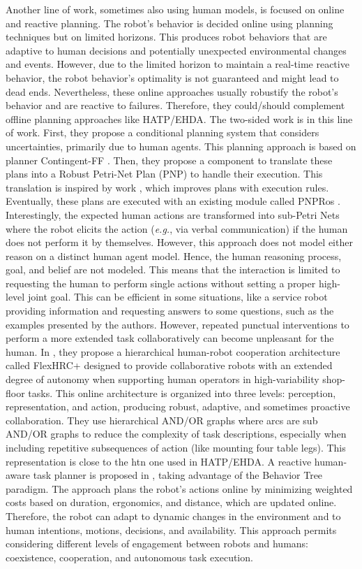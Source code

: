 Another line of work, sometimes also using human models, is focused on online and reactive planning. The robot's behavior is decided online using planning techniques but on limited horizons. This produces robot behaviors that are adaptive to human decisions and potentially unexpected environmental changes and events. However, due to the limited horizon to maintain a real-time reactive behavior, the robot behavior's optimality is not guaranteed and might lead to dead ends. Nevertheless, these online approaches usually robustify the robot's behavior and are reactive to failures. Therefore, they could/should complement offline planning approaches like HATP/EHDA.
The two-sided work \cite{sanelli_short_term_2017} is in this line of work. First, they propose a conditional planning system that considers uncertainties, primarily due to human agents. This planning approach is based on planner Contingent-FF \cite{hoffmann2005contingent}. Then, they propose a component to translate these plans into a Robust Petri-Net Plan (PNP) to handle their execution. This translation is inspired by work \cite{iocchi2016practical}, which improves plans with execution rules. Eventually, these plans are executed with an existing module called PNPRos \cite{ziparo2011petri}. Interestingly, the expected human actions are transformed into sub-Petri Nets where the robot elicits the action (\textit{e.g.}, via verbal communication) if the human does not perform it by themselves. 
However, this approach does not model either reason on a distinct human agent model. Hence, the human reasoning process, goal, and belief are not modeled. This means that the interaction is limited to requesting the human to perform single actions without setting a proper high-level joint goal. This can be efficient in some situations, like a service robot providing information and requesting answers to some questions, such as the examples presented by the authors. However, repeated punctual interventions to perform a more extended task collaboratively can become unpleasant for the human.
In \cite{DarvishSMC21}, they propose a hierarchical human-robot cooperation architecture called FlexHRC+ designed to provide collaborative robots with an extended degree of autonomy when supporting human operators in high-variability shop-floor tasks. This online architecture is organized into three levels: perception, representation, and action, producing robust, adaptive, and sometimes proactive collaboration. 
They use hierarchical AND/OR graphs where arcs are sub AND/OR graphs to reduce the complexity of task descriptions, especially when including repetitive subsequences of action (like mounting four table legs). This representation is close to the \acrshort{htn} one used in HATP/EHDA. 
A reactive human-aware task planner is proposed in \cite{fusaro_human_aware_2021}, taking advantage of the Behavior Tree paradigm. The approach plans the robot's actions online by minimizing weighted costs based on duration, ergonomics, and distance, which are updated online. Therefore, the robot can adapt to dynamic changes in the environment and to human intentions, motions, decisions, and availability. This approach permits considering different levels of engagement between robots and humans: coexistence, cooperation, and autonomous task execution. 

